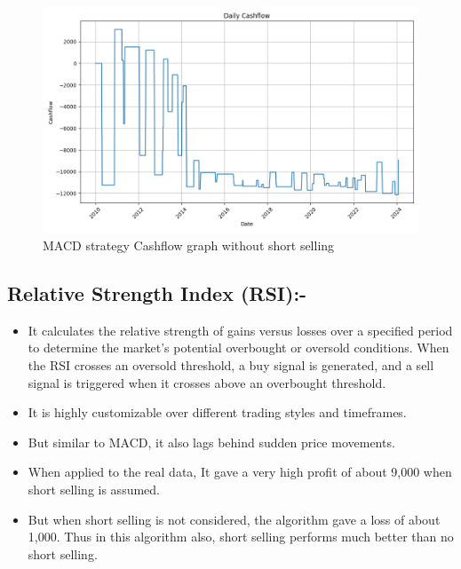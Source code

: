 \documentclass[11pt]{article}
\begin{document}
\begin{figure}[H]
  \centering
  \includegraphics[width=1\textwidth]{DMA_without_short.png}
  \caption{MACD strategy Cashflow graph without short selling}
\end{figure}

\subsection{Relative Strength Index (RSI):-}
\begin{itemize}
    \item It calculates the relative strength of gains versus losses over a specified period to determine the market's potential overbought or oversold conditions. When the RSI crosses an oversold threshold, a buy signal is generated, and a sell signal is triggered when it crosses above an overbought threshold.
    \item It is highly customizable over different trading styles and timeframes.
    \item But similar to MACD, it also lags behind sudden price movements.
    \item When applied to the real data, It gave a very high profit of about 9,000 when short selling is assumed.
    \item But when short selling is not considered, the algorithm gave a loss of about 1,000. Thus in this algorithm also, short selling performs much better than no short selling.
\end{itemize}
\end{document}

